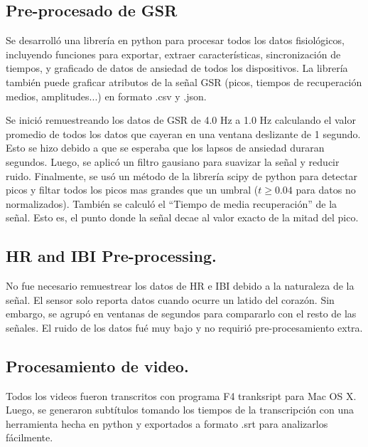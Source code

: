 \subsection{Pre-procesado de GSR}\label{secc:gsrpreprocessing}
Se desarroll\'o una librer\'ia en python para procesar todos los datos fisiol\'ogicos, incluyendo funciones para exportar, extraer caracter\'isticas, sincronizaci\'on de tiempos, y graficado de datos de ansiedad de todos los dispositivos. La librer\'ia tambi\'en puede graficar atributos de la se\~nal GSR (picos, tiempos de recuperaci\'on medios, amplitudes...) en formato .csv y .json.

Se inici\'o remuestreando los datos de GSR de 4.0 Hz a 1.0 Hz calculando el valor promedio de todos los datos que cayeran en una ventana deslizante de 1 segundo. Esto se hizo debido a que se esperaba que los lapsos de ansiedad duraran segundos. Luego, se aplic\'o un filtro gausiano para suavizar la se\~nal y reducir ruido. Finalmente, se us\'o un m\'etodo de la librer\'ia scipy de python para detectar picos y filtar todos los picos mas grandes que un umbral ($t \geqslant 0.04$ para datos no normalizados). Tambi\'en se calcul\'o el ``Tiempo de media recuperaci\'on'' de la se\~nal. Esto es, el punto donde la se\~nal decae al valor exacto de la mitad del pico.

\subsection{HR and IBI Pre-processing.}\label{secc:hribipreprocessing}
No fue necesario remuestrear los datos de HR e IBI debido a la naturaleza de la se\~nal. El sensor solo reporta datos cuando ocurre un latido del coraz\'on. Sin embargo, se agrup\'o en ventanas de segundos para compararlo con el resto de las se\~nales. El ruido de los datos fu\'e muy bajo y no requiri\'o pre-procesamiento extra.

\subsection{Procesamiento de video.}\label{secc:videoprocesing}
Todos los videos fueron transcritos con programa F4 tranksript para Mac OS X. Luego, se generaron subt\'itulos tomando los tiempos de la transcripci\'on con una herramienta hecha en python y exportados a formato .srt para analizarlos f\'acilmente.
